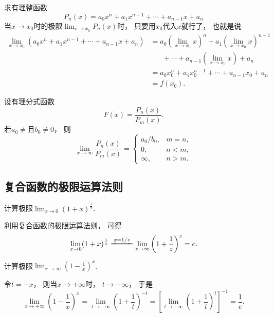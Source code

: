 \begin{example}\label{example:极限.有理整函数在一点的极限}
求有理整函数\[
	P_n(x) = a_0 x^n + a_1 x^{n-1} + \dotsb + a_{n-1} x + a_n
\]当\(x\to x_0\)时的极限\(\lim_{x\to x_0} P_n(x)\)时，
只要用\(x_0\)代入\(x\)就行了，
也就是说\begin{align*}
	\lim_{x \to x_0} (a_0 x^n + a_1 x^{n-1} + \dotsb + a_{n-1} x + a_n)
	&= a_0 \left(\lim_{x \to x_0} x\right)^n
		+ a_1 \left(\lim_{x \to x_0} x\right)^{n-1} \\
	&\hspace{20pt}+ \dotsb
		+ a_{n-1} \left(\lim_{x \to x_0} x\right)
		+ a_n \\
	&= a_0 x_0^n + a_1 x_0^{n-1} + \dotsb + a_{n-1} x_0 + a_n \\
	&= f(x_0).
\end{align*}
\end{example}

\begin{example}
设有理分式函数\[
	F(x) = \frac{P_n(x)}{P_m(x)}.
\]
若\(a_0\neq\)且\(b_0\neq0\)，
则\[
	\lim_{x\to\infty} \frac{P_n(x)}{P_m(x)}
	= \left\{ \begin{array}{cl}
		a_0/b_0, & m=n, \\
		0, & n<m, \\
		\infty, & n>m.
	\end{array} \right.
\]
\end{example}

\subsection{复合函数的极限运算法则}


\begin{example}
计算极限\(\lim_{x\to0} (1+x)^{\frac1x}\).
\begin{solution}
利用复合函数的极限运算法则，
可得\[
	\lim_{x\to0} (1+x)^{\frac1x}
	\xlongequal{x=1/z}
	\lim_{z\to\infty} \left(1+\frac1z\right)^z
	= e.
\]
\end{solution}
\end{example}

\begin{example}
计算极限\(\lim_{x \to \infty} \left(1 - \frac1x\right)^x\).
\begin{solution}
令\(t = -x\)，
则当\(x \to +\infty\)时，
\(t \to -\infty\)，
于是\[
	\lim_{x \to +\infty} \left(1 - \frac1x\right)^x
	= \lim_{t \to -\infty} \left(1 + \frac1t\right)^{-t}
	= \left[\lim_{t \to -\infty} \left(1 + \frac1t\right)^t\right]^{-1}
	= \frac1e.
\]
\end{solution}
\end{example}

